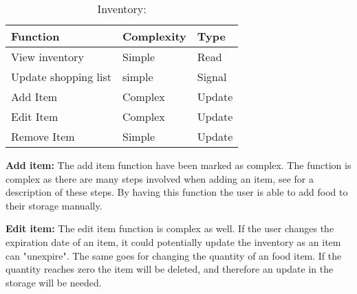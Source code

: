 \begin{table}[H]
\begin{flushleft}
  \end{flushleft}
	\caption{Inventory:}
  \begin{tabular}{|l|l|l|}\hline
		\textbf{Function}&\textbf{Complexity}&\textbf{Type}\\\hline
	  View inventory        &  Simple  & Read   \\\hline
	  Update shopping list  &  simple  & Signal \\\hline
	  Add Item              &  Complex & Update \\\hline
	  Edit Item             &  Complex & Update \\\hline
	  Remove Item           &  Simple  & Update \\\hline
  \end{tabular}
  \begin{flushleft}  	  
    \textbf{Add item:} The add item function have been marked as complex. The function is complex as there are many steps involved when adding an item, see  for a description of these steps. By having this function the user is able to add food to their storage manually.
    
    \textbf{Edit item:} The edit item function is complex as well. If the user changes the expiration date of an item, it could potentially update the inventory as an item can "unexpire". The same goes for changing the quantity of an food item. If the quantity reaches zero the item will be deleted, and therefore an update in the storage will be needed.
  \end{flushleft}
\end{table}
